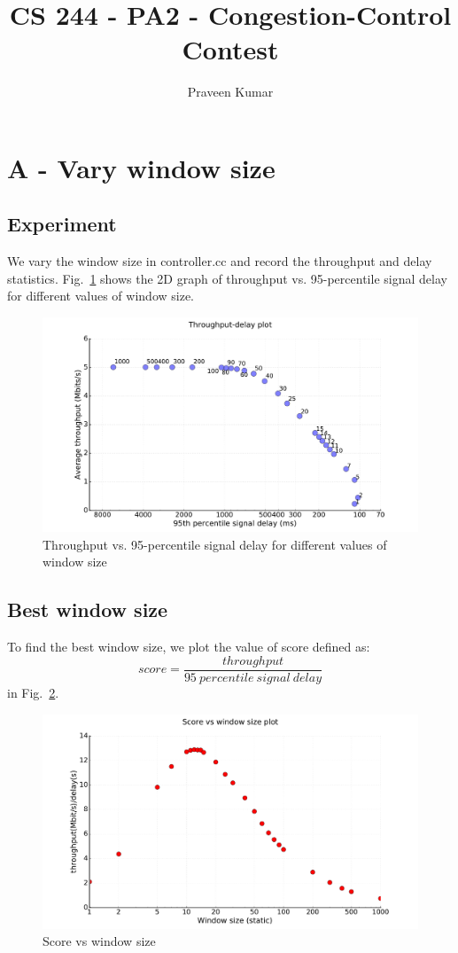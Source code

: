 \documentclass{article}
\begin{document}
\title{CS 244 - PA2 - Congestion-Control Contest}
\author{Praveen Kumar}

\maketitle

\section{A - Vary window size}
\subsection{Experiment}
We vary the window size in controller.cc and record the throughput and
delay statistics. Fig.~\ref{A} shows the 2D graph of throughput vs.
95-percentile signal delay for different values of window size.
\begin{figure}[h]
\includegraphics[width=\columnwidth]{"../A/A"}
\caption{Throughput vs. 95-percentile signal delay for different values of window size}
\label{A}
\end{figure}

\subsection{Best window size}
To find the best window size, we plot the value of score defined as:
\[
  score = \frac{throughput}{95~percentile\ signal\ delay}
\]
in Fig.~\ref{A-score}.
\begin{figure}[h]
\includegraphics[width=\columnwidth]{"../A/A-score"}
\caption{Score vs window size}
\label{A-score}
\end{figure}
\end{document}
